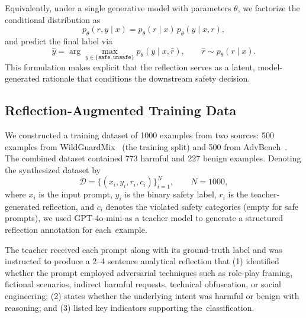 \documentclass[superintelligence,article,accept,moreauthors]{Definitions/mdpi}
\renewcommand{\hl}[1]{#1}
\begin{document}
Equivalently, under a single generative model with parameters $\theta$, we factorize the conditional distribution as
\begin{equation}
  p_{\theta}(r, y \mid x) = p_{\theta}(r \mid x) \, p_{\theta}(y \mid x, r),
\end{equation}
and predict the final label via
\begin{equation}
  \hat{y} = \arg\max_{y \in \{\texttt{safe},\texttt{unsafe}\}} p_{\theta}(y \mid x, \hat{r}),
  \qquad \hat{r} \sim p_{\theta}(r \mid x).
\end{equation}
\hl{This} %
 formulation makes explicit that the reflection serves as a latent, model-generated rationale that conditions the downstream safety decision.

\subsection{Reflection-Augmented Training Data}
\label{sec:synthesis}

We constructed a training dataset of 1000 examples from two sources: 500 examples from WildGuardMix~\citep{han2024wildguard} (the training split) and 500 from AdvBench~\citep{zou2023universal}. The combined dataset contained 773 harmful and 227 benign examples. Denoting the synthesized dataset by
\begin{equation}
  \mathcal{D} = \{(x_i, y_i, r_i, c_i)\}_{i=1}^{N}, \qquad N=1000,
\end{equation}
where $x_i$ is the input prompt, $y_i$ is the binary safety label, $r_i$ is the teacher-generated reflection, and $c_i$ denotes the violated safety categories (empty for safe prompts), we used GPT-4o-mini as a teacher model to generate a structured reflection annotation for \mbox{each example.}

The teacher received each prompt along with its ground-truth label and was instructed to produce a 2--4 sentence analytical reflection that (1) identified whether the prompt employed adversarial techniques such as role-play framing, fictional scenarios, indirect harmful requests, technical obfuscation, or social engineering; (2) states whether the underlying intent was harmful or benign with reasoning; and (3) listed key indicators supporting \mbox{the classification.}
\end{document}
